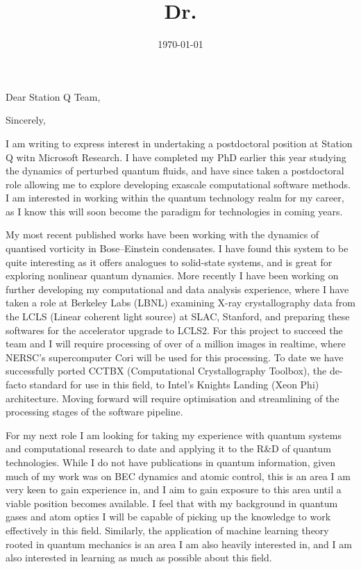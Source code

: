 \documentclass[11pt,a4paper,unicode]{moderncv}
\title{Dr.}
\begin{document}
    \date{\today} %
    \opening{Dear Station Q Team,}
    \closing{Sincerely,}
    \makelettertitle
{
    \vspace{-0.5cm}
    I am writing to express interest in undertaking a postdoctoral position at Station Q witn Microsoft Research. I have completed my PhD earlier this year studying the dynamics of perturbed quantum fluids, and have since taken a postdoctoral role allowing me to explore developing exascale computational software methods. I am interested in working within the quantum technology realm for my career, as I know this will soon become the paradigm for technologies in coming years.

    My most recent published works have been working with the dynamics of quantised vorticity in Bose--Einstein condensates. I have found this system to be quite interesting as it offers analogues to solid-state systems, and is great for exploring nonlinear quantum dynamics. More recently I have been working on further developing my computational and data analysis experience, where I have taken a role at Berkeley Labs (LBNL) examining X-ray crystallography data from the LCLS (Linear coherent light source) at SLAC, Stanford, and preparing these softwares for the accelerator upgrade to LCLS2. For this project to succeed the team and I will require processing of over of a million images in realtime, where NERSC's supercomputer Cori will be used for this processing. To date we have successfully ported CCTBX (Computational Crystallography Toolbox), the de-facto standard for use in this field, to Intel's Knights Landing (Xeon Phi) architecture. Moving forward will require optimisation and streamlining of the processing stages of the software pipeline.

    For my next role I am looking for taking my experience with quantum systems and computational research to date and applying it to the R\&D of quantum technologies. While I do not have publications in quantum information, given much of my work was on BEC dynamics and atomic control, this is an area I am very keen to gain experience in, and I aim to gain exposure to this area until a viable position becomes available. I feel that with my background in quantum gases and atom optics I will be capable of picking up the knowledge to work effectively in this field. Similarly, the application of machine learning theory rooted in quantum mechanics is an area I am also heavily interested in, and I am also interested in learning as much as possible about this field.

}
\end{document}
